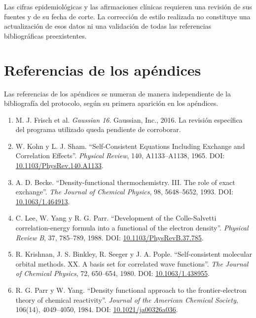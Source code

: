 \documentclass[12 pt, letter, oneside]{book}
\begin{document}
Las cifras epidemiológicas y las afirmaciones clínicas requieren una revisión de sus fuentes y de su fecha de corte. La corrección de estilo realizada no constituye una actualización de esos datos ni una validación de todas las referencias bibliográficas preexistentes.


\clearpage
\chapter*{Referencias de los apéndices}
{}
Las referencias de los apéndices se numeran de manera independiente de la bibliografía del protocolo, según su primera aparición en los apéndices.
\begingroup
\renewcommand{\labelenumi}{[\arabic{enumi}]}
\begin{enumerate}
\setlength{\itemsep}{0.65\baselineskip}
\item\label{anexo-ref-1} M. J. Frisch et al. \textit{Gaussian 16}. Gaussian, Inc., 2016. La revisión específica del programa utilizado queda pendiente de corroborar.

\item\label{anexo-ref-2} W. Kohn y L. J. Sham. ``Self-Consistent Equations Including Exchange and Correlation Effects''. \textit{Physical Review}, 140, A1133--A1138, 1965. DOI: \href{https://doi.org/10.1103/PhysRev.140.A1133}{10.1103/PhysRev.140.A1133}.

\item\label{anexo-ref-3} A. D. Becke. ``Density-functional thermochemistry. III. The role of exact exchange''. \textit{The Journal of Chemical Physics}, 98, 5648--5652, 1993. DOI: \href{https://doi.org/10.1063/1.464913}{10.1063/1.464913}.

\item\label{anexo-ref-4} C. Lee, W. Yang y R. G. Parr. ``Development of the Colle-Salvetti correlation-energy formula into a functional of the electron density''. \textit{Physical Review B}, 37, 785--789, 1988. DOI: \href{https://doi.org/10.1103/PhysRevB.37.785}{10.1103/PhysRevB.37.785}.

\item\label{anexo-ref-5} R. Krishnan, J. S. Binkley, R. Seeger y J. A. Pople. ``Self-consistent molecular orbital methods. XX. A basis set for correlated wave functions''. \textit{The Journal of Chemical Physics}, 72, 650--654, 1980. DOI: \href{https://doi.org/10.1063/1.438955}{10.1063/1.438955}.

\item\label{anexo-ref-6} R. G. Parr y W. Yang. ``Density functional approach to the frontier-electron theory of chemical reactivity''. \textit{Journal of the American Chemical Society}, 106(14), 4049--4050, 1984. DOI: \href{https://doi.org/10.1021/ja00326a036}{10.1021/ja00326a036}.


\end{enumerate}
\end{document}

